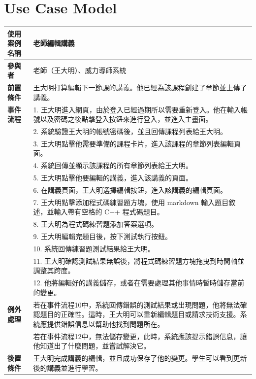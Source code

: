 \documentclass[12pt]{article}
\begin{document}
\section{Use Case Model}

\begin{table}[H]
  \centering
  \begin{tabular}{|l|p{14cm}|}
  \hline
  \textbf{使用案例名稱} & 老師編輯講義 \\ 
  \hline
  \textbf{參與者} & 老師（王大明）、威力導師系統 \\ 
  \hline
  \textbf{前置條件} & 王大明打算編輯下一節課的講義。他已經為該課程創建了章節並上傳了講義。\\ 
  \hline
  \textbf{事件流程} 
  & 1. 王大明進入網頁，由於登入已經過期所以需要重新登入。他在輸入帳號以及密碼之後點擊登入按鈕來進行登入，並進入主畫面。 \\
  & 2. 系統驗證王大明的帳號密碼後，並且回傳課程列表給王大明。 \\
  & 3. 王大明點擊他需要準備的課程卡片，進入該課程的章節列表編輯頁面。 \\
  & 4. 系統回傳並顯示該課程的所有章節列表給王大明。 \\
  & 5. 王大明點擊他要編輯的講義，進入該講義的頁面。 \\
  & 6. 在講義頁面，王大明選擇編輯按鈕，進入該講義的編輯頁面。 \\
  & 7. 王大明點擊添加程式碼練習題方塊，使用 markdown 輸入題目敘述，並輸入帶有空格的 C++ 程式碼題目。 \\
  & 8. 王大明為程式碼練習題添加答案選項。 \\
  & 9. 王大明編輯完題目後，按下測試執行按鈕。 \\
  & 10. 系統回傳練習題測試結果給王大明。 \\
  & 11. 王大明確認測試結果無誤後，將程式碼練習題方塊拖曳到時間軸並調整其跨度。 \\ 
  & 12. 他將編輯好的講義儲存，或者在需要處理其他事情時暫時儲存當前的變更。 \\
  \hline
  \textbf{例外處理} 
  & 若在事件流程10中，系統回傳錯誤的測試結果或出現問題，他將無法確認題目的正確性。這時，王大明可以重新編輯題目或請求技術支援。系統應提供錯誤信息以幫助他找到問題所在。 \\
  & 若在事件流程12中，無法儲存變更，此時，系統應該提示錯誤信息，讓他知道出了什麼問題，並嘗試解決它。 \\
  \hline
  \textbf{後置條件} & 王大明完成講義的編輯，並且成功保存了他的變更。學生可以看到更新後的講義並進行學習。 \\
  \hline
  \end{tabular}
\end{table}
\end{document}

